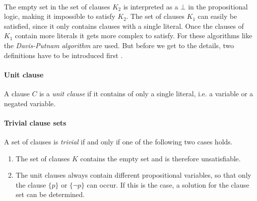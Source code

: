 \\[0.2cm]
The empty set in the set of clauses $K_2$ is interpreted as a $\bot$ in the propositional logic, making it impossible to satisfy $K_2$. The set of clauses $K_1$ can easily be satisfied, since it only contains clauses with a single literal. Once the clauses of $K_1$ contain more literals it gets more complex to satisfy. For these algorithms like the \textit{Davis-Putnam algorithm} are used. But before we get to the details, two definitions have to be introduced first \cite{Zhang2000}. 

\paragraph{Unit clause}
A clause $C$ is a \emph{unit clause} if it contains of only a single literal, i.e. a variable or a negated variable.

\paragraph{Trivial clause sets}
A set of clauses is \emph{trivial} if and only if one of the following two cases holds.

\begin{enumerate}
  \item The set of clauses $K$ contains the empty set and is therefore unsatisfiable.
  \item The unit clauses always contain different propositional variables, so that only the clause $\{p\}$ or $\{\neg p\}$ can occur. If this is the case, a solution for the clause set can be determined.
\end{enumerate}

